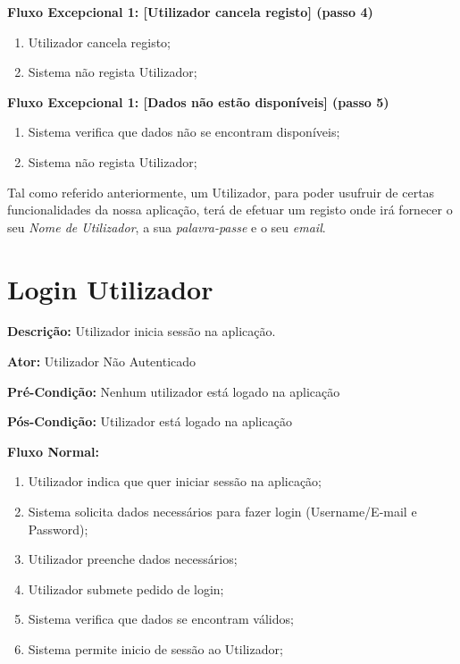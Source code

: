 \documentclass[a4paper,12pt]{scrreprt}
\newcommand{\tab}{
    \hspace{1cm}}
\begin{document}
\textbf{Fluxo Excepcional 1: [Utilizador cancela registo] (passo 4)}
\begin{enumerate}[label=4.\arabic*]
    \item Utilizador cancela registo;
    \item Sistema não regista Utilizador;
\end{enumerate}

\textbf{Fluxo Excepcional 1: [Dados não estão disponíveis] (passo 5)}
\begin{enumerate}[label=5.\arabic*]
    \item Sistema verifica que dados não se encontram disponíveis;
    \item Sistema não regista Utilizador;
\end{enumerate}

\vspace{1.5cm}

\tab Tal como referido anteriormente, um Utilizador, para poder usufruir de certas funcionalidades da nossa aplicação, terá de efetuar um registo onde irá fornecer o seu \emph{Nome de Utilizador}, a sua \emph{palavra-passe} e o seu \emph{email}.

\clearpage

\section{Login Utilizador}

\textbf{Descrição: }Utilizador inicia sessão na aplicação.

\textbf{Ator: }Utilizador Não Autenticado

\textbf{Pré-Condição: }Nenhum utilizador está logado na aplicação

\textbf{Pós-Condição: }Utilizador está logado na aplicação

\textbf{Fluxo Normal: }
\begin{enumerate}
    \item Utilizador indica que quer iniciar sessão na aplicação;
    \item Sistema solicita dados necessários para fazer login (Username/E-mail e Password);
    \item Utilizador preenche dados necessários;
    \item Utilizador submete pedido de login;
    \item Sistema verifica que dados se encontram válidos;
    \item Sistema permite inicio de sessão ao Utilizador;
\end{enumerate}
\end{document}
